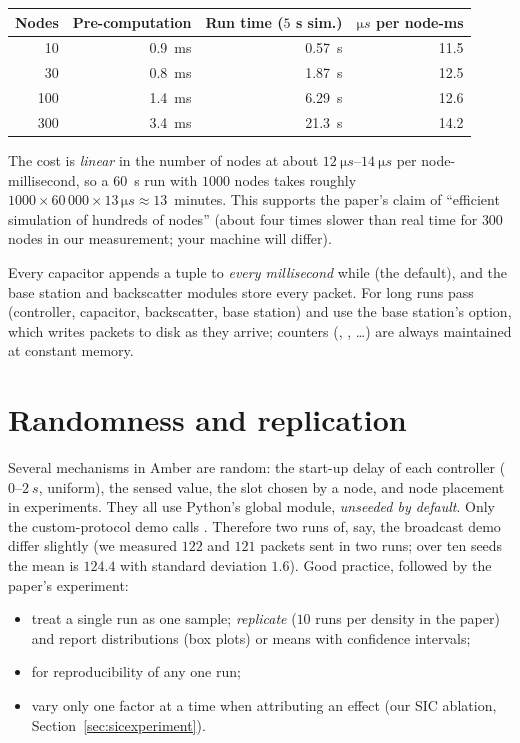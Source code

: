 \begin{center}
\small
\renewcommand{\arraystretch}{1.1}
\begin{tabular}{@{}rrrr@{}}
\toprule
Nodes & Pre-computation & Run time ($5$ s sim.) & $\si{\micro s}$ per node-ms\\
\midrule
 10 & \SI{0.9}{ms} & \SI{0.57}{s} & 11.5\\
 30 & \SI{0.8}{ms} & \SI{1.87}{s} & 12.5\\
100 & \SI{1.4}{ms} & \SI{6.29}{s} & 12.6\\
300 & \SI{3.4}{ms} & \SI{21.3}{s} & 14.2\\
\bottomrule
\end{tabular}
\end{center}
The cost is \emph{linear} in the number of nodes at about $\SIrange{12}{14}{\micro s}$ per node-millisecond, so a $60$~s run with $1000$ nodes takes roughly $1000\times60\,000\times13\,\si{\micro s}\approx13$~minutes. This supports the paper's claim of ``efficient simulation of hundreds of nodes''
(about four times slower than real time for $300$ nodes in our measurement; your machine will differ).

\begin{reality}
Every capacitor appends a  tuple to  \emph{every millisecond} while  (the default), and the base station and backscatter modules store every packet. For long runs pass 
(controller, capacitor, backscatter, base station) and use the base station's  option, which writes packets to disk as they arrive; counters (, , \dots) are always maintained at constant memory.
\end{reality}

\section{Randomness and replication}
\label{sec:random}

Several mechanisms in Amber are random: the start-up delay of each controller ($0$--$\SI{2}{s}$, uniform), the sensed value, the slot chosen by a node, and node placement in experiments. They all use Python's global  module,
\emph{unseeded by default}. Only the custom-protocol demo calls . Therefore two runs of, say, the broadcast demo differ slightly (we measured $122$ and $121$ packets sent in two runs; over ten seeds the mean is $124.4$ with standard deviation $1.6$).
Good practice, followed by the paper's experiment:
\begin{itemize}
 \item treat a single run as one sample; \emph{replicate} ($10$ runs per density in the paper) and report distributions (box plots) or means with confidence intervals;
 \item {} for reproducibility of any one run;
 \item vary only one factor at a time when attributing an effect (our SIC ablation, Section~\ref{sec:sicexperiment}).
\end{itemize}


